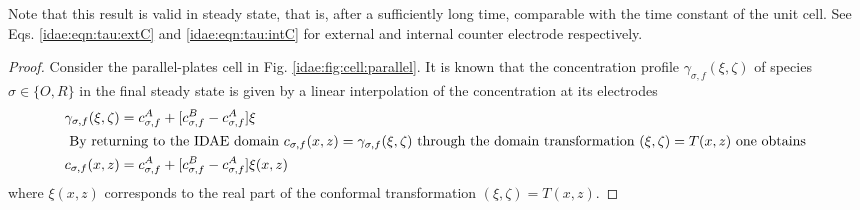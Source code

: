 Note that this result is valid in steady state, that is,
after a sufficiently long time,
comparable with the time constant of the unit cell.
See Eqs. \eqref{idae:eqn:tau:extC} and \eqref{idae:eqn:tau:intC}
for external and internal counter electrode respectively.

\begin{proof}
	Consider the parallel-plates cell in Fig. \ref{idae:fig:cell:parallel}.
	It is known that the concentration profile $\gamma_{\sigma,f}(\xi,\zeta)$
	of species $\sigma \in \{O,R\}$ in the final steady state
	is given by a linear interpolation of the concentration at its electrodes
	\begin{subequations}
		\begin{align}
		\gamma_{\sigma,f}(\xi,\zeta)
		&= c_{\sigma,f}^{A} + [c_{\sigma,f}^{B} - c_{\sigma,f}^{A}] \xi
		\\
		\intertext{
			By returning to the IDAE domain
			$c_{\sigma,f}(x,z) = \gamma_{\sigma,f}(\xi,\zeta)$
			through the domain transformation $(\xi,\zeta) = T(x,z)$
			one obtains
		}
		c_{\sigma,f}(x,z)
		&= c_{\sigma,f}^{A} + [c_{\sigma,f}^{B} - c_{\sigma,f}^{A}]\xi(x,z)
		\end{align}
	\end{subequations}
	where $\xi(x,z)$ corresponds to the real part of the conformal transformation $(\xi,\zeta) = T(x,z)$.
	

\end{proof}
